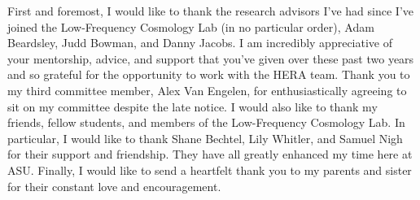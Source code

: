First and foremost, I would like to thank the research advisors I've had since
I've joined the Low-Frequency Cosmology Lab (in no particular order), Adam Beardsley,
Judd Bowman, and Danny Jacobs. I am incredibly appreciative of your mentorship,
advice, and support that you've given over these past two years and so grateful for the
opportunity to work with the HERA team. Thank you to my third committee member, Alex Van Engelen, for enthusiastically
agreeing to sit on my committee despite the late notice.
I would also like to thank my friends, fellow students, and members of the
Low-Frequency Cosmology Lab. In particular, I would like to
thank Shane Bechtel, Lily Whitler, and Samuel Nigh for their support and friendship.
They have all greatly enhanced my time here at ASU. Finally, I would like to send
a heartfelt thank you to my parents and sister for their constant love and encouragement.

\clearpage
